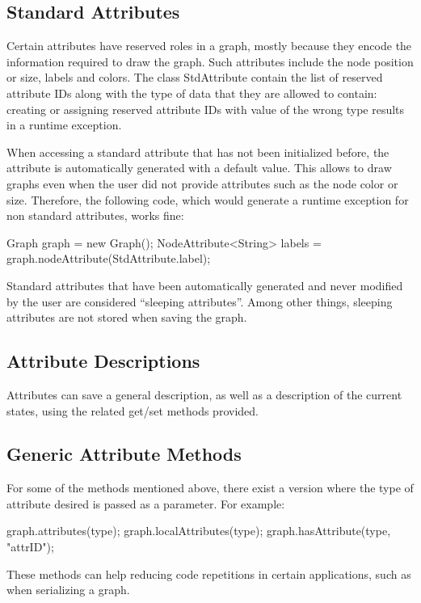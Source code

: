 \subsection{Standard Attributes}
Certain attributes have reserved roles in a graph, mostly because they encode the information required to draw the graph. Such attributes include the node position or size, labels and colors. The class StdAttribute contain the list of reserved attribute IDs along with the type of data that they are allowed to contain: creating or assigning reserved attribute IDs with value of the wrong type results in a runtime exception.

When accessing a standard attribute that has not been initialized before, the attribute is automatically generated with a default value. This allows to draw graphs even when the user did not provide attributes such as the node color or size. Therefore, the following code, which would generate a runtime exception for non standard attributes, works fine:
\begin{java}
Graph graph = new Graph();
NodeAttribute<String> labels = graph.nodeAttribute(StdAttribute.label);
\end{java}

Standard attributes that have been automatically generated and never modified by the user are considered ``sleeping attributes''. Among other things, sleeping attributes are not stored when saving the graph.


\subsection{Attribute Descriptions}
Attributes can save a general description, as well as a description of the current states, using the related get/set methods provided.


\subsection{Generic Attribute Methods}
For some of the methods mentioned above, there exist a version where the type of attribute desired is passed as a parameter. For example:
\begin{java}
graph.attributes(type);
graph.localAttributes(type);
graph.hasAttribute(type, "attrID");
\end{java}
These methods can help reducing code repetitions in certain applications, such as when serializing a graph.




